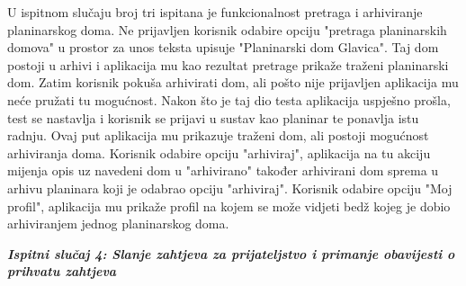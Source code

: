  		U ispitnom slučaju broj tri ispitana je funkcionalnost pretraga i arhiviranje planinarskog doma. Ne prijavljen korisnik odabire opciju "pretraga planinarskih domova" u prostor za unos teksta upisuje "Planinarski dom Glavica". Taj dom postoji u arhivi i aplikacija mu kao rezultat pretrage prikaže traženi planinarski dom. Zatim korisnik pokuša arhivirati dom, ali pošto nije prijavljen aplikacija mu neće pružati tu mogućnost. Nakon što je taj dio testa aplikacija uspješno prošla, test se nastavlja i korisnik se prijavi u sustav kao planinar te ponavlja istu radnju. Ovaj put aplikacija mu prikazuje traženi dom, ali postoji mogućnost arhiviranja doma. Korisnik odabire opciju "arhiviraj", aplikacija na tu akciju mijenja opis uz navedeni dom u "arhivirano" također arhivirani dom sprema u arhivu planinara koji je odabrao opciju "arhiviraj". Korisnik odabire opciju "Moj profil", aplikacija mu prikaže profil na kojem se može vidjeti bedž kojeg je dobio arhiviranjem jednog planinarskog doma.\newline
 		
 		 	\textbf{\textit{Ispitni slučaj 4: Slanje zahtjeva za prijateljstvo i primanje obavijesti o prihvatu zahtjeva}}
 		
